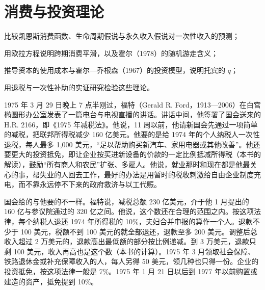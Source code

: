 \chapter{消费与投资理论}\label{ch:consumption}

\begin{chapterguide}
\begin{guidegoals}
\item 比较凯恩斯消费函数、生命周期假说与永久收入假说对一次性收入的预测；
\item 用欧拉方程说明跨期消费平滑，以及霍尔（1978）的随机游走含义；
\item 推导资本的使用成本与霍尔—乔根森（1967）的投资模型，说明托宾的 $q$；
\item 用退税与一次性补助的实证研究检验这些理论。
\end{guidegoals}
\end{chapterguide}

1975 年 3 月 29 日晚上 7 点半刚过，福特（Gerald R. Ford，1913—2006）在白宫椭圆形办公室发表了一篇电台与电视直播的讲话\cite{ford1975,loc39}。讲话中间，他签署了国会送来的 H.R. 2166，即《1975 年减税法》\cite{ford1975,pl9412}。他说，11 周以前，他请新国会先通过一项简单的减税，把联邦所得税减少 160 亿美元\cite{ford1975}。他要的是给 1974 年的个人纳税人一次性退税，每人最多 1,000 美元，“足以帮助购买新汽车、家用电器或其他改善”\cite{ford1975}。他还要更大的投资抵免，即让企业按买进新设备的价款的一定比例抵减所得税（本书的解读），鼓励“所有商人和农民”扩张、多雇人\cite{ford1975}。他说，就业那时和现在都是他最关心的事，帮失业的人回去工作，最好的办法是用暂时的税收刺激给自由企业制度充电，而不靠永远停不下来的政府救济与以工代赈\cite{ford1975}。

国会给的与他要的不一样。福特说，减税总额 230 亿美元，介于他 1 月提出的 160 亿与参议院通过的 320 亿之间\cite{ford1975}。他说，这个数还在合理的范围之内\cite{ford1975}。按这项法律，每个纳税人退还 1974 年所得税的 10\%，夫妇合并申报的算作一个人\cite{pl9412}。退款不少于 100 美元，税额不到 100 美元的就全部退还，退款至多 200 美元\cite{pl9412}。调整后总收入超过 2 万美元的，退款高出最低额的部分按比例递减\cite{pl9412}。到 3 万美元，退款只剩 100 美元，收入再高也是这个数（本书的计算）。1975 年 3 月领取社会保障、铁路退休金或补充保障收入的人，每人另得 50 美元，领几种也只得一份\cite{pl9412}。企业的投资抵免，按这项法律一般是 7\%\cite{pl9412}。1975 年 1 月 21 日以后到 1977 年以前购置或建造的资产，抵免提到 10\%\cite{pl9412}。

